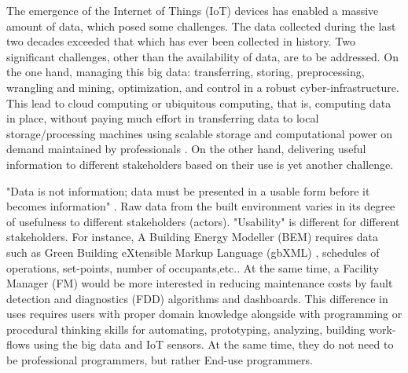 \documentclass{scsSimAUDPaperFormat}
\begin{document}
The emergence of the Internet of Things (IoT) devices has enabled a massive amount of data, which posed some challenges. The data collected during the last two decades exceeded that which has ever been collected in history\cite{Ramaswamy2015InternetReview}. Two significant challenges, other than the availability of data, are to be addressed. On the one hand, managing this big data: transferring, storing, preprocessing, wrangling and mining, optimization, and control in a robust cyber-infrastructure. This lead to cloud computing or ubiquitous computing, that is, computing data in place, without paying much effort in transferring data to local storage/processing machines using scalable storage and computational power on demand maintained by professionals \cite{MellTheTechnology,Bhardwaj2010Cloud,Dillon2010CloudChallenges}. On the other hand, delivering useful information to different stakeholders based on their use is yet another challenge.

"Data is not information; data must be presented in a usable form before it becomes information" \cite[p.134]{Reen1996UsabilityFramework}. Raw data from the built environment varies in its degree of usefulness to different stakeholders (actors). "Usability" is different for different stakeholders. For instance, A Building Energy Modeller (BEM) requires data such as Green Building eXtensible Markup Language (gbXML) \cite{GreenBuildingXMLgbXMLSchema2019GbXMLSchema}, schedules of operations, set-points, number of occupants,etc.. At the same time, a Facility Manager (FM) would be more interested in reducing maintenance costs by fault detection and diagnostics (FDD)\cite{Zibion2018DevelopmentInformation} algorithms and dashboards. This difference in uses requires users with proper domain knowledge alongside with programming or procedural thinking skills for automating, prototyping, analyzing, building work-flows using the big data and IoT sensors. At the same time, they do not need to be professional programmers, but rather End-use programmers.
\end{document}
